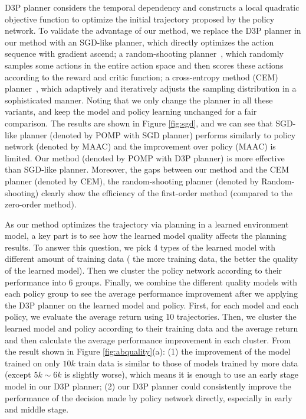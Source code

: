 \documentclass{article} %
\newcommand{\yue}[1]{ {#1}}
\newcommand{\revision}[1]{{#1}}
\begin{document}
\revision{\noindent{\bf Is our D3P planner advantageous in continuous control? }} D3P planner considers the temporal dependency and constructs a local quadratic objective function to optimize the initial trajectory proposed by the policy network. To validate the advantage of our method, we replace the D3P planner in our method with an SGD-like planner, which directly optimizes the action sequence with gradient ascend; \revision{a random-shooting planner~\citep{press2007numerical}, which randomly samples some actions in the entire action space and then scores these actions according to the reward and critic function; a cross-entropy method (CEM) planner~\citep{rubinstein2004cross,hansen2022temporal}, which adaptively and iteratively adjusts the sampling distribution in a  sophisticated manner. Noting that we only change the planner in all these variants, and keep the model and policy learning unchanged for a fair comparison.} The results are shown in Figure \ref{fig:sgd}, and we can see that SGD-like planner (denoted by POMP with SGD planner) performs similarly to policy network (denoted by MAAC) and the improvement over policy (MAAC) is limited. Our method (denoted by POMP with D3P planner) is more effective than  SGD-like planner. \revision{Moreover, the gaps between our method and the CEM planner (denoted by CEM), the random-shooting planner (denoted by Random-shooting) clearly show the efficiency of the first-order method (compared to the zero-order method).}


 As our method optimizes the trajectory via planning in a learned environment model, a key part is to see how the learned model quality affects the planning results. To answer this question, we pick 4 types of the learned model with different amount of training data ( the more training data, the better the quality of the learned model). Then we cluster the policy network according to their performance into 6 groups. Finally, we combine the different quality models with each policy group to see the average performance improvement after we applying the D3P planner on the learned model and policy. \yue{First, for each model and each policy, we  evaluate the average return using 10 trajectories. Then, we cluster the learned model and policy according to their training data and the average return and then calculate the average performance improvement in each cluster}. From the result shown in Figure \ref{fig:abquality}(a): (1) the improvement of the model trained on only  $10k$ train data is similar to those of models trained by more data (except $5k{\sim}6k$ is slightly worse), which means it is enough to use an early stage model in our D3P planner; (2) our D3P planner could consistently improve the performance of the decision  made by policy network directly, especially in early and middle stage.
\end{document}
